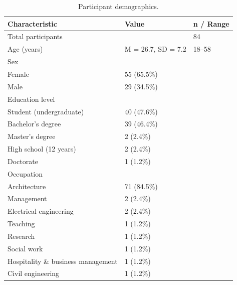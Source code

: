 \begin{table}
\caption{Participant demographics.}
\begin{tabular}{lll}
\toprule
Characteristic & Value & n / Range \\
\midrule
Total participants &  & 84 \\
Age (years) & M = 26.7, SD = 7.2 & 18–58 \\
Sex &  &  \\
  Female & 55 (65.5\%) &  \\
  Male & 29 (34.5\%) &  \\
Education level &  &  \\
  Student (undergraduate) & 40 (47.6\%) &  \\
  Bachelor's degree & 39 (46.4\%) &  \\
  Master's degree & 2 (2.4\%) &  \\
  High school (12 years) & 2 (2.4\%) &  \\
  Doctorate & 1 (1.2\%) &  \\
Occupation &  &  \\
  Architecture & 71 (84.5\%) &  \\
  Management & 2 (2.4\%) &  \\
  Electrical engineering & 2 (2.4\%) &  \\
  Teaching & 1 (1.2\%) &  \\
  Research & 1 (1.2\%) &  \\
  Social work & 1 (1.2\%) &  \\
  Hospitality \& business management & 1 (1.2\%) &  \\
  Civil engineering & 1 (1.2\%) &  \\
\bottomrule
\end{tabular}
\end{table}
